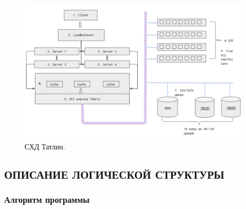 \begin{figure}[t!]
	\centering
	\includegraphics[width=\textwidth]{Kenenbek/images/tatlin.png}
	\caption{СХД Татлин.}
	\label{fig:tatlin}
\end{figure}


\subsection{ОПИСАНИЕ ЛОГИЧЕСКОЙ СТРУКТУРЫ}

\subsubsection{Алгоритм программы}



